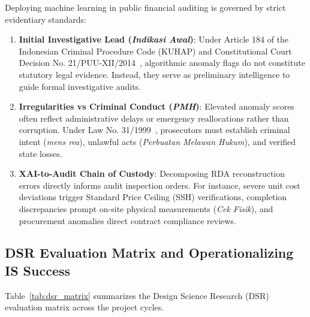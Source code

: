 \documentclass[conference]{IEEEtran}
\begin{document}
Deploying machine learning in public financial auditing is governed by strict evidentiary standards:
\begin{enumerate}
    \item \textbf{Initial Investigative Lead (\textit{Indikasi Awal})}: Under Article 184 of the Indonesian Criminal Procedure Code (KUHAP) and Constitutional Court Decision No. 21/PUU-XII/2014~\cite{ref34}, algorithmic anomaly flags do not constitute statutory legal evidence. Instead, they serve as preliminary intelligence to guide formal investigative audits.
    \item \textbf{Irregularities vs Criminal Conduct (\textit{PMH})}: Elevated anomaly scores often reflect administrative delays or emergency reallocations rather than corruption. Under Law No. 31/1999~\cite{ref34}, prosecutors must establish criminal intent (\textit{mens rea}), unlawful acts (\textit{Perbuatan Melawan Hukum}), and verified state losses.
    \item \textbf{XAI-to-Audit Chain of Custody}: Decomposing RDA reconstruction errors directly informs audit inspection orders. For instance, severe unit cost deviations trigger Standard Price Ceiling (SSH) verifications, completion discrepancies prompt on-site physical measurements (\textit{Cek Fisik}), and procurement anomalies direct contract compliance reviews.
\end{enumerate}

\subsection{DSR Evaluation Matrix and Operationalizing IS Success}

Table~\ref{tab:dsr_matrix} summarizes the Design Science Research (DSR) evaluation matrix across the project cycles.

\begin{table}[htbp]
\centering
\caption{Design Science Research (DSR) Evaluation Matrix}
\label{tab:dsr_matrix}
\setlength{\tabcolsep}{2.5pt}
\end{table}
\end{document}
